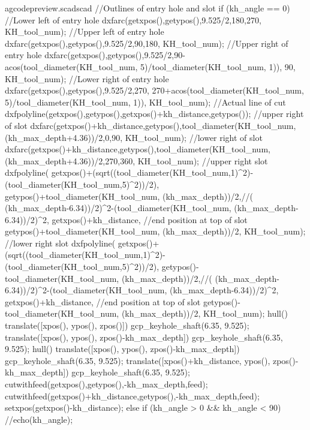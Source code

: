 \documentclass{ltxdoc}
\begin{document}
\lstset{firstnumber=1}%
\begin{writecode}{a}{gcodepreview.scad}{scad}
//Outlines of entry hole and slot
  if (kh_angle == 0) {
    //Lower left of entry hole
    dxfarc(getxpos(),getypos(),9.525/2,180,270, KH_tool_num);
    //Upper left of entry hole
    dxfarc(getxpos(),getypos(),9.525/2,90,180, KH_tool_num);
    //Upper right of entry hole
    dxfarc(getxpos(),getypos(),9.525/2,90-acos(tool_diameter(KH_tool_num, 5)/tool_diameter(KH_tool_num, 1)), 90, KH_tool_num);
    //Lower right of entry hole
    dxfarc(getxpos(),getypos(),9.525/2,270, 270+acos(tool_diameter(KH_tool_num, 5)/tool_diameter(KH_tool_num, 1)), KH_tool_num);
    //Actual line of cut
    dxfpolyline(getxpos(),getypos(),getxpos()+kh_distance,getypos());
    //upper right of slot
    dxfarc(getxpos()+kh_distance,getypos(),tool_diameter(KH_tool_num, (kh_max_depth+4.36))/2,0,90, KH_tool_num);
    //lower right of slot
    dxfarc(getxpos()+kh_distance,getypos(),tool_diameter(KH_tool_num, (kh_max_depth+4.36))/2,270,360, KH_tool_num);
    //upper right slot
    dxfpolyline(
        getxpos()+(sqrt((tool_diameter(KH_tool_num,1)^2)-(tool_diameter(KH_tool_num,5)^2))/2), 
        getypos()+tool_diameter(KH_tool_num, (kh_max_depth))/2,//( (kh_max_depth-6.34))/2)^2-(tool_diameter(KH_tool_num, (kh_max_depth-6.34))/2)^2,
        getxpos()+kh_distance,
    //end position at top of slot
        getypos()+tool_diameter(KH_tool_num, (kh_max_depth))/2, 
        KH_tool_num);
    //lower right slot
    dxfpolyline(
        getxpos()+(sqrt((tool_diameter(KH_tool_num,1)^2)-(tool_diameter(KH_tool_num,5)^2))/2), 
        getypos()-tool_diameter(KH_tool_num, (kh_max_depth))/2,//( (kh_max_depth-6.34))/2)^2-(tool_diameter(KH_tool_num, (kh_max_depth-6.34))/2)^2,
        getxpos()+kh_distance,
    //end position at top of slot
        getypos()-tool_diameter(KH_tool_num, (kh_max_depth))/2, 
        KH_tool_num);
    hull(){
      translate([xpos(), ypos(), zpos()]){
        gcp_keyhole_shaft(6.35, 9.525);
      }
      translate([xpos(), ypos(), zpos()-kh_max_depth]){
        gcp_keyhole_shaft(6.35, 9.525);
      }
    }
    hull(){
      translate([xpos(), ypos(), zpos()-kh_max_depth]){
        gcp_keyhole_shaft(6.35, 9.525);
      }
      translate([xpos()+kh_distance, ypos(), zpos()-kh_max_depth]){
        gcp_keyhole_shaft(6.35, 9.525);
      }
    }
    cutwithfeed(getxpos(),getypos(),-kh_max_depth,feed);
    cutwithfeed(getxpos()+kh_distance,getypos(),-kh_max_depth,feed);
    setxpos(getxpos()-kh_distance);
  } else if (kh_angle > 0 && kh_angle < 90) {
//echo(kh_angle);
}
\end{writecode}
\end{document}
